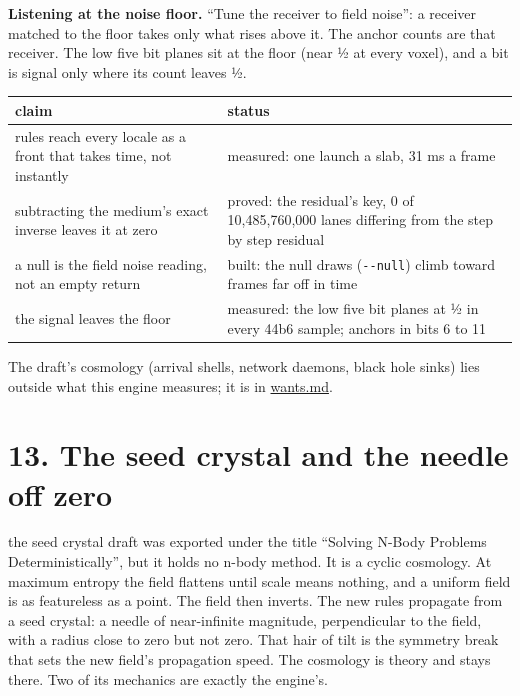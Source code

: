 \textbf{Listening at the noise floor.} “Tune the receiver to field noise”: a receiver matched to the floor takes only what rises above it. The anchor counts are that receiver. The low five bit planes sit at the floor (near ½ at every voxel), and a bit is signal only where its count leaves ½.

{\small
\setlength{\tabcolsep}{6pt}
\begin{longtable}{>{\RaggedRight\arraybackslash}p{}>{\RaggedRight\arraybackslash}p{}}
\toprule
claim & status \\
\midrule
\endhead
rules reach every locale as a front that takes time, not instantly & measured: one launch a slab, 31 ms a frame \\
subtracting the medium's exact inverse leaves it at zero & proved: the residual's key, 0 of 10,485,760,000 lanes differing from the step by step residual \\
a null is the field noise reading, not an empty return & built: the null draws (\texttt{-\allowbreak{}-\allowbreak{}null}) climb toward frames far off in time \\
the signal leaves the floor & measured: the low five bit planes at ½ in every 44b6 sample; anchors in bits 6 to 11 \\
\bottomrule
\end{longtable}
}

The draft's cosmology (arrival shells, network daemons, black hole sinks) lies outside what this engine measures; it is in \hyperref[chap:wants]{wants.md}.

\section{\texorpdfstring{13. The seed crystal and the needle off zero}{13. The seed crystal and the needle off zero}}

the seed crystal draft was exported under the title “Solving N-Body Problems Deterministically”, but it holds no n-body method. It is a cyclic cosmology. At maximum entropy the field flattens until scale means nothing, and a uniform field is as featureless as a point. The field then inverts. The new rules propagate from a seed crystal: a needle of near-infinite magnitude, perpendicular to the field, with a radius close to zero but not zero. That hair of tilt is the symmetry break that sets the new field's propagation speed. The cosmology is theory and stays there. Two of its mechanics are exactly the engine's.

